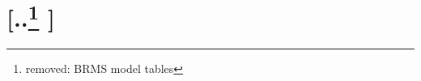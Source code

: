 \documentclass[unnumsec,webpdf,modern,medium]{oup-authoring-template}
\providecommand{\DIFdeltex}[1]{{\protect\color{red} [..\footnote{removed: #1} ]}} %
\providecommand{\DIFdel}[1]{\texorpdfstring{\DIFdeltex{#1}}{}} %
\begin{document}







\section{\DIFdel{BRMS model tables}}
\addtocounter{section}{-1}%


\end{document}
